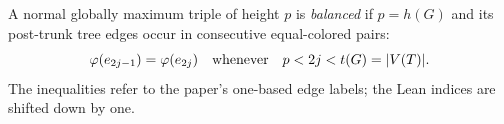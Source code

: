 \begin{definition}
A normal globally maximum triple of height $p$ is \emph{balanced} if
$p=h(G)$ and its post-trunk tree edges occur in consecutive equal-colored
pairs:
\[
 \varphi(e_{2j-1})=\varphi(e_{2j})
 \quad\hbox{whenever}\quad p<2j<t(G)=|V(T)|.
\]
The inequalities refer to the paper's one-based edge labels; the Lean
indices are shifted down by one.
\end{definition}
